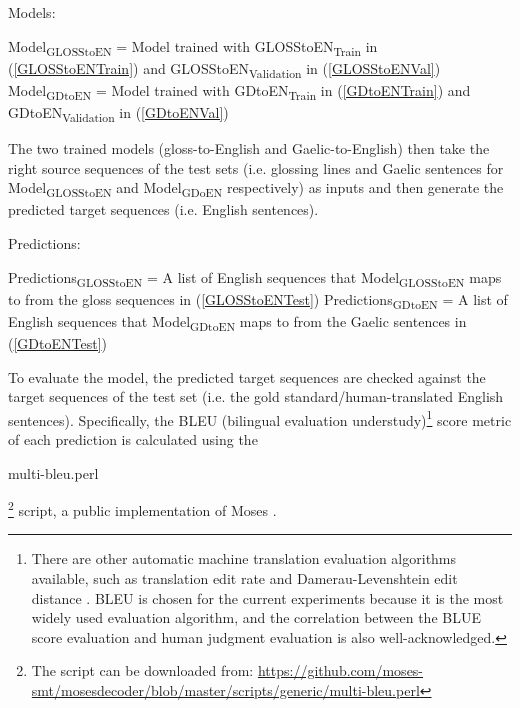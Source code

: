 \documentclass[final]{ua-thesis}
\numberwithin{equation}{section}
\begin{document}
\begin{exe}
\ex Models:
	\begin{xlist}
	\ex \label{ModelGlossToEN} Model\textsubscript{GLOSStoEN} = Model trained with GLOSStoEN\textsubscript{Train} in (\ref{GLOSStoENTrain}) and GLOSStoEN\textsubscript{Validation} in (\ref{GLOSStoENVal})
	\ex \label{ModelGDToEN}Model\textsubscript{GDtoEN} = Model trained with GDtoEN\textsubscript{Train} in (\ref{GDtoENTrain}) and GDtoEN\textsubscript{Validation} in (\ref{GDtoENVal})
	\end{xlist}	
\end{exe}
The two trained models (gloss-to-English and Gaelic-to-English) then take the right source sequences of the test sets (i.e. glossing lines and Gaelic sentences for Model\textsubscript{GLOSStoEN} and Model\textsubscript{GDoEN} respectively) as inputs and then generate the predicted target sequences (i.e. English sentences).

\begin{exe}
\ex Predictions:
	\begin{xlist}
	\ex Predictions\textsubscript{GLOSStoEN} = A list of English sequences that Model\textsubscript{GLOSStoEN} maps to from the gloss sequences in (\ref{GLOSStoENTest})
	\ex Predictions\textsubscript{GDtoEN} = A list of English sequences that Model\textsubscript{GDtoEN} maps to from the Gaelic sentences in (\ref{GDtoENTest})
	\end{xlist}	
\end{exe}

To evaluate the model, the predicted target sequences are checked against the target sequences of the test set (i.e. the gold standard/human-translated English sentences).
Specifically, the BLEU (bilingual evaluation understudy)\footnote{There are other automatic machine translation evaluation algorithms available, such as translation edit rate \citep{Snover06astudy} and Damerau-Levenshtein edit distance \citep{damerau1964technique, levenshtein1966binary}. BLEU is chosen for the current experiments because it is the most widely used evaluation algorithm, and the correlation between the BLUE score evaluation and human judgment evaluation is also well-acknowledged.} score metric \citep{bleu} of each prediction is calculated using the \begin{myfont} multi-bleu.perl\end{myfont}\footnote{The script can be downloaded from: \url{https://github.com/moses-smt/mosesdecoder/blob/master/scripts/generic/multi-bleu.perl}}
script, a public implementation of Moses \citep{moses}. 
\end{document}
